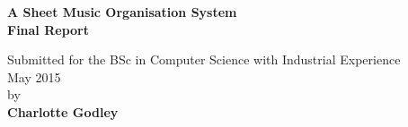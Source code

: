 \begin{titlepage}
    \begin{center}
        \vspace*{1cm}
        \Huge
        \textbf{A Sheet Music Organisation System\\\Large Final Report}
        
        \vspace{0.5cm}
        \normalsize
        Submitted for the BSc in Computer Science with Industrial Experience\\
        \vspace{0.5cm}
        May 2015\\
        \vspace{1.5cm}
        by\\
        \vspace{0.5cm}
        \large
        \textbf{Charlotte Godley}
        \normalsize
        \vfill
        
    \end{center}
\end{titlepage}